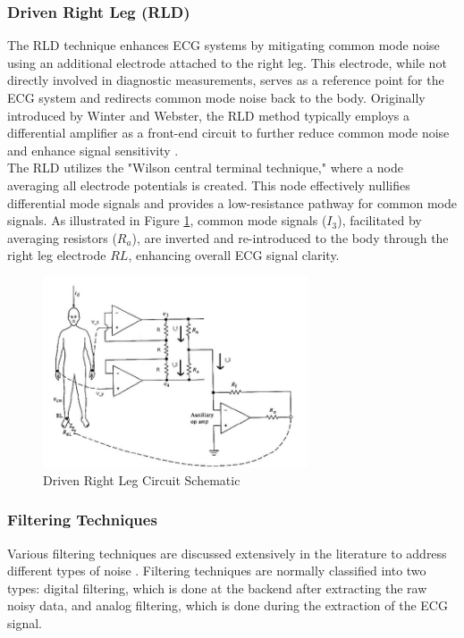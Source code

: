 \subsubsection{Driven Right Leg (RLD)}\label{RLD}
\vspace{1em}
\noindent The RLD technique enhances ECG systems by mitigating common mode noise using an additional electrode attached to the right leg. This electrode, while not directly involved in diagnostic measurements, serves as a reference point for the ECG system and redirects common mode noise back to the body. Originally introduced by Winter and Webster, the RLD method typically employs a differential amplifier as a front-end circuit to further reduce common mode noise and enhance signal sensitivity \cite{Winter1983Driven}.\\

\noindent The RLD utilizes the "Wilson central terminal technique," where a node averaging all electrode potentials is created. This node effectively nullifies differential mode signals and provides a low-resistance pathway for common mode signals. As illustrated in Figure \ref{fig:rld_circuit}, common mode signals ($I_3$), facilitated by averaging resistors ($R_a$), are inverted and re-introduced to the body through the right leg electrode $RL$, enhancing overall ECG signal clarity.

\begin{figure}[htbp]
	\centering
	\includegraphics[width=0.7\textwidth]{images/driven right leg}
	\caption{Driven Right Leg Circuit Schematic \cite{Saha2018Design}}
	\label{fig:rld_circuit}
\end{figure}

\subsubsection{Filtering Techniques}
\vspace{1em}
\noindent Various filtering techniques are discussed extensively in the literature to address different types of noise \cite{Luo2010Review}. Filtering techniques are normally classified into two types: digital filtering, which is done at the backend after extracting the raw noisy data, and analog filtering, which is done during the extraction of the ECG signal.

